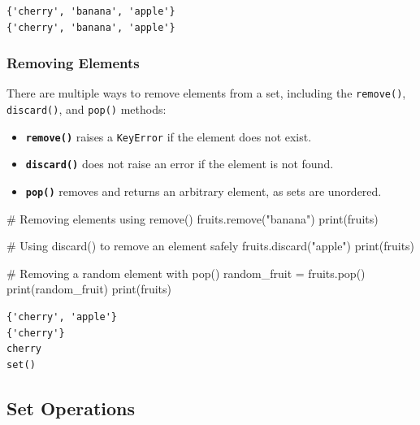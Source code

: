 \documentclass[
  letterpaper,
  DIV=11,
  numbers=noendperiod]{scrreprt}
\newenvironment{Shaded}{\begin{snugshade}}{\end{snugshade}}
\newcommand{\BuiltInTok}[1]{\textcolor[rgb]{0.00,0.23,0.31}{#1}}
\newcommand{\CommentTok}[1]{\textcolor[rgb]{0.37,0.37,0.37}{#1}}
\newcommand{\NormalTok}[1]{\textcolor[rgb]{0.00,0.23,0.31}{#1}}
\newcommand{\OperatorTok}[1]{\textcolor[rgb]{0.37,0.37,0.37}{#1}}
\newcommand{\StringTok}[1]{\textcolor[rgb]{0.13,0.47,0.30}{#1}}
\providecommand{\tightlist}{%
  \setlength{\itemsep}{0pt}\setlength{\parskip}{0pt}}\usepackage{longtable,booktabs,array}
\begin{document}
\begin{verbatim}
{'cherry', 'banana', 'apple'}
{'cherry', 'banana', 'apple'}
\end{verbatim}

\hypertarget{removing-elements-1}{%
\subsubsection{Removing Elements}\label{removing-elements-1}}

There are multiple ways to remove elements from a set, including the
\texttt{remove()}, \texttt{discard()}, and \texttt{pop()} methods:

\begin{itemize}
\tightlist
\item
  \textbf{\texttt{remove()}} raises a \texttt{KeyError} if the element
  does not exist.
\item
  \textbf{\texttt{discard()}} does not raise an error if the element is
  not found.
\item
  \textbf{\texttt{pop()}} removes and returns an arbitrary element, as
  sets are unordered.
\end{itemize}

\begin{Shaded}
\begin{Highlighting}[]
\CommentTok{\# Removing elements using remove()}
\NormalTok{fruits.remove(}\StringTok{"banana"}\NormalTok{)}
\BuiltInTok{print}\NormalTok{(fruits)  }

\CommentTok{\# Using discard() to remove an element safely}
\NormalTok{fruits.discard(}\StringTok{"apple"}\NormalTok{)}
\BuiltInTok{print}\NormalTok{(fruits)  }

\CommentTok{\# Removing a random element with pop()}
\NormalTok{random\_fruit }\OperatorTok{=}\NormalTok{ fruits.pop()}
\BuiltInTok{print}\NormalTok{(random\_fruit)  }
\BuiltInTok{print}\NormalTok{(fruits)  }
\end{Highlighting}
\end{Shaded}

\begin{verbatim}
{'cherry', 'apple'}
{'cherry'}
cherry
set()
\end{verbatim}

\hypertarget{set-operations}{%
\subsection{Set Operations}\label{set-operations}}
\end{document}
